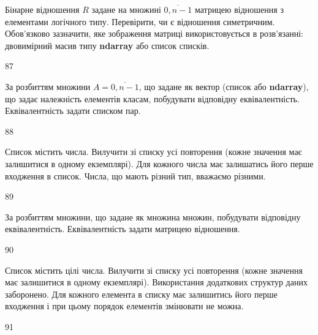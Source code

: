 Бінарне відношення $R$ задане на множині $\overline{0,n-1}$ матрицею відношення з елементами логічного типу. Перевірити, чи є відношення симетричним. Обов'язково зазначити, яке зображення матриці використовується в розв'язанні: двовимірний масив типу \textbf{ndarray} або список списків.
\\\par
87 














За розбиттям множини $A=\overline{0,n-1}$, що задане як вектор (список або  \textbf{ndarray}), що задає належність елементів класам, побудувати відповідну еквівалентність. Еквівалентність задати списком пар.
\\\par
88 














Список містить числа. Вилучити зі списку усі повторення (кожне значення має залишитися в одному екземплярі). Для кожного числа має залишатись його перше входження в список. Числа, що мають різний тип, вважаємо різними.
\\\par
89 














За розбиттям множини, що задане як множина множин, побудувати відповідну еквівалентність. Еквівалентність задати матрицею відношення.
\\\par
90 














Список містить цілі числа. Вилучити зі списку усі повторення (кожне значення має залишитися в одному екземплярі). Використання додаткових структур даних заборонено. Для кожного елемента в списку має залишитись його перше входження і при цьому порядок елементів змінювати не можна.
\\\par
91 















